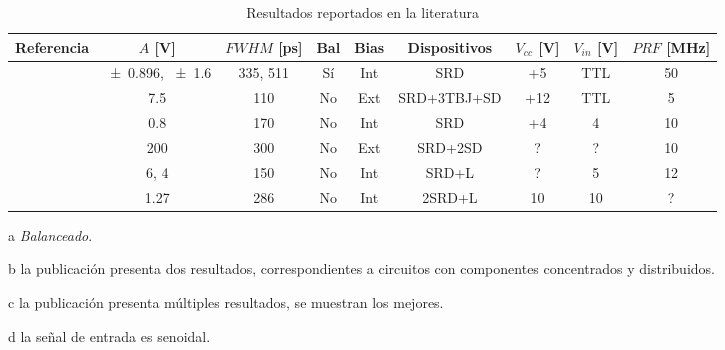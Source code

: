 \begin{table}
  \begin{threeparttable}[b]
    \label{tab:mytable}
    \caption{Resultados reportados en la literatura}
    {\small
    \begin{tabular}{ccccccccc}
        \hline
        Referencia & $A$ [\unit{\volt}] & $FWHM$ [\unit{\pico\second}] &
        Bal \tnote{a} & Bias & Dispositivos & $V_{cc}$ [\unit{\volt}] & $V_{in}$ [\unit{\volt}] & $PRF$ [\unit{\mega\hertz}] \\
        \hline
        \cite{rulikowski2004} & \num{\pm 0.896}, \num{\pm 1.6} \tnote{b} & 335, 511 & Sí & Int & SRD & +5 & TTL & 50 \\
        \cite{protiva2009} & \num{7.5} & 110 & No & Ext & SRD+3TBJ+SD & +12 & TTL & 5 \\
        \cite{kamal2014} & \num{0.8} & 170 & No & Int & SRD & +4 & 4 & 10 \\
        \cite{han2002} & \num{200} & 300 & No & Ext & SRD+2SD & ? & ? & 10 \\
        \cite{han2005} & \num{+6}, \num{+4} & 150 & No & Int & SRD+L & ? & 5 & 12 \\
        \cite{oloumi2018} & \num{1.27} \tnote{c} & 286 & No & Int & 2SRD+L &
        10 & 10 \tnote{d} & ? \\
    \end{tabular}
}
   \begin{tablenotes}
     \item [a] \textit{Balanceado}.
     \item [b] la publicación presenta dos resultados, correspondientes a
       circuitos con componentes concentrados y distribuidos.
     \item [c] la publicación presenta múltiples resultados, se muestran
       los mejores.
     \item [d] la señal de entrada es senoidal.
   \end{tablenotes}
  \end{threeparttable}
\end{table}
